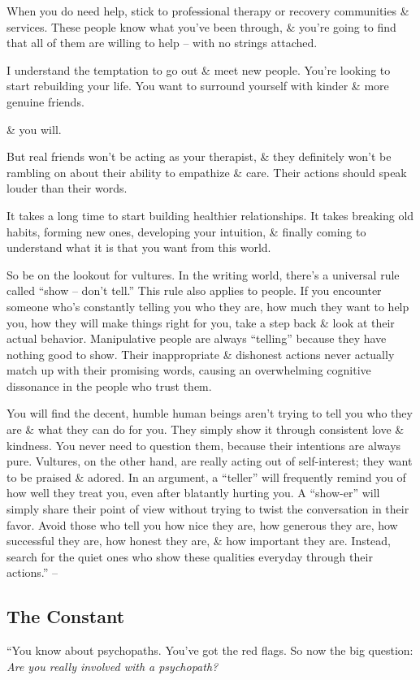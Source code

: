 \documentclass{article}
\numberwithin{equation}{section}
\begin{document}
When you do need help, stick to professional therapy or recovery communities \& services. These people know what you've been through, \& you're going to find that all of them are willing to help -- with no strings attached.

I understand the temptation to go out \& meet new people. You're looking to start rebuilding your life. You want to surround yourself with kinder \& more genuine friends.

\& you will.

But real friends won't be acting as your therapist, \& they definitely won't be rambling on about their ability to empathize \& care. Their actions should speak louder than their words.

It takes a long time to start building healthier relationships. It takes breaking old habits, forming new ones, developing your intuition, \& finally coming to understand what it is that you want from this world.

So be on the lookout for vultures. In the writing world, there's a universal rule called ``show -- don't tell.'' This rule also applies to people. If you encounter someone who's constantly telling you who they are, how much they want to help you, how they will make things right for you, take a step back \& look at their actual behavior. Manipulative people are always ``telling'' because they have nothing good to show. Their inappropriate \& dishonest actions never actually match up with their promising words, causing an overwhelming cognitive dissonance in the people who trust them.

You will find the decent, humble human beings aren't trying to tell you who they are \& what they can do for you. They simply show it through consistent love \& kindness. You never need to question them, because their intentions are always pure. Vultures, on the other hand, are really acting out of self-interest; they want to be praised \& adored. In an argument, a ``teller'' will frequently remind you of how well they treat you, even after blatantly hurting you. A ``show-er'' will simply share their point of view without trying to twist the conversation in their favor. Avoid those who tell you how nice they are, how generous they are, how successful they are, how honest they are, \& how important they are. Instead, search for the quiet ones who show these qualities everyday through their actions.'' -- \cite[pp. 17--19]{MacKenzie2015}

\subsection{The Constant}
``You know about psychopaths. You've got the red flags. So now the big question: \textit{Are you really involved with a psychopath?}
\end{document}
